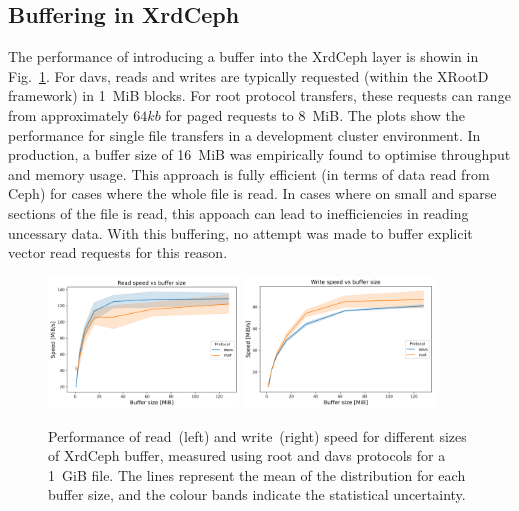 \documentclass{webofc}
\begin{document}
\subsection{Buffering in XrdCeph\label{buffer}}
The performance of introducing a buffer into the XrdCeph layer is showin in Fig.~\ref{fig:buffering}.
For davs, reads and writes are typically requested (within the XRootD framework) in 1~MiB blocks. For root protocol transfers, these requests can range from approximately $64kb$ for paged requests to 8~MiB. The plots show the performance for single file transfers in a development cluster environment. In production, a buffer size of 16~MiB was empirically found to optimise throughput and memory usage. This approach is fully efficient (in terms of data read from Ceph) for cases where the whole file is read. In cases where on small and sparse sections of the file is read, this appoach can lead to inefficiencies in reading uncessary data. 
With this buffering, no attempt was made to buffer explicit vector read requests for this reason. 
%
\begin{figure}[h]
     \centering
     \includegraphics[width=0.45\textwidth,clip]{figures/fig_read_speed.png}\hfil
     \includegraphics[width=0.45\textwidth,clip]{figures/fig_write_speed.png}
     \caption{Performance of read~(left) and write~(right) speed for different sizes of XrdCeph buffer, measured using root and davs protocols for a 1~GiB file. The lines represent the mean of the distribution for each buffer size, and the colour bands indicate the statistical uncertainty.}
     \label{fig:buffering}       %
\end{figure}
\end{document}
